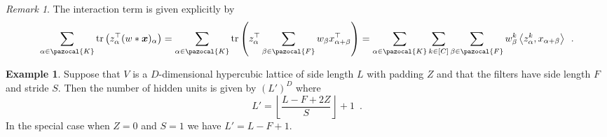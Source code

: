 \documentclass[12pt]{article}
\DeclareMathOperator{\tr}{tr}
\theoremstyle{definition}%
\theoremstyle{definition}
\newtheorem{exmp}{Example}[section]
\theoremstyle{remark}
\newtheorem*{remk}{Remark}
\begin{document}
\begin{remk}
The interaction term is given explicitly by
\begin{align}
	\sum_{\alpha \in \pazocal{K}} \tr \left( z_\alpha^\top  (w \ast \bm{x})_\alpha \right)
		= \sum_{\alpha \in \pazocal{K}}\tr\left( z_\alpha^\top \sum_{\beta \in \pazocal{F}}w_\beta x_{\alpha + \beta}^\top \right)
		= \sum_{\alpha \in \pazocal{K}} \sum_{k \in [C]} \sum_{\beta \in \pazocal{F}} w_\beta^k \left\langle z_\alpha^k, x_{\alpha + \beta} \right\rangle \enspace .
\end{align}
\end{remk}

\begin{exmp}
Suppose that $V$ is a $D$-dimensional hypercubic lattice of side length $L$ with padding $Z$ and that the filters have side length $F$ and stride $S$. Then the number of hidden units is given by $(L')^D$ where
\begin{equation}
	L'
		= \left\lfloor \frac{L - F + 2Z}{S} \right\rfloor + 1 \enspace .
\end{equation}
In the special case when $Z = 0$ and $S=1$ we have $L' = L - F + 1$.
\end{exmp}
\end{document}
